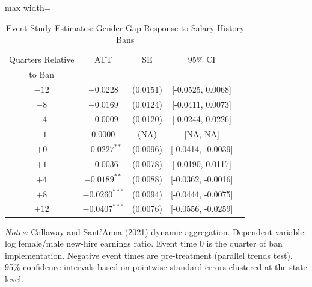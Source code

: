 \begin{table}[htbp]
\centering
\caption{Event Study Estimates: Gender Gap Response to Salary History Bans}
\label{tab:eventstudy}
\begin{threeparttable}
\begin{adjustbox}{max width=\textwidth}
\begin{tabular}{ccccc}
\toprule
Quarters Relative & ATT & SE & 95\% CI & \\
to Ban & & & & \\
\midrule
$-12$ & $-0.0228$ & (0.0151) & [-0.0525, 0.0068] \\
$-8$ & $-0.0169$ & (0.0124) & [-0.0411, 0.0073] \\
$-4$ & $-0.0009$ & (0.0120) & [-0.0244, 0.0226] \\
$-1$ & $0.0000$ & (NA) & [NA, NA] \\
\midrule
$+0$ & $-0.0227^{**}$ & (0.0096) & [-0.0414, -0.0039] \\
$+1$ & $-0.0036$ & (0.0078) & [-0.0190, 0.0117] \\
$+4$ & $-0.0189^{**}$ & (0.0088) & [-0.0362, -0.0016] \\
$+8$ & $-0.0260^{***}$ & (0.0094) & [-0.0444, -0.0075] \\
$+12$ & $-0.0407^{***}$ & (0.0076) & [-0.0556, -0.0259] \\
\bottomrule
\end{tabular}
\end{adjustbox}
\begin{tablenotes}[flushleft]
\small
\item \textit{Notes:} Callaway and Sant'Anna (2021) dynamic aggregation.
Dependent variable: log female/male new-hire earnings ratio.
Event time 0 is the quarter of ban implementation.
Negative event times are pre-treatment (parallel trends test).
95\% confidence intervals based on pointwise standard errors clustered at the state level.
\end{tablenotes}
\end{threeparttable}
\end{table}
